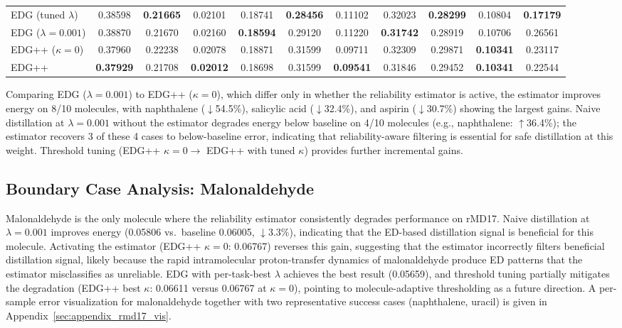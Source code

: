 \begin{table}[!htb]
\begin{tabular}{lcccccccccc}
    EDG (tuned $\lambda$) & 0.38598 & \textbf{0.21665} & 0.02101 & 0.18741 & \textbf{0.28456} & 0.11102 & 0.32023 & \textbf{0.28299} & 0.10804 & \textbf{0.17179} \\
    EDG ($\lambda\!=\!0.001$) & 0.38870 & 0.21670 & 0.02160 & \textbf{0.18594} & 0.29120 & 0.11220 & \textbf{0.31742} & 0.28919 & 0.10706 & 0.26561 \\
    EDG++ ($\kappa\!=\!0$) & 0.37960 & 0.22238 & 0.02078 & 0.18871 & 0.31599 & 0.09711 & 0.32309 & 0.29871 & \textbf{0.10341} & 0.23117 \\
    EDG++ & \textbf{0.37929} & 0.21708 & \textbf{0.02012} & 0.18698 & 0.31599 & \textbf{0.09541} & 0.31846 & 0.29452 & \textbf{0.10341} & 0.22544 \\
    \bottomrule
    \end{tabular}
\end{table}

Comparing EDG ($\lambda\!=\!0.001$) to EDG++ ($\kappa\!=\!0$), which differ only in whether the reliability estimator is active, the estimator improves energy on 8/10 molecules, with naphthalene ($\downarrow$54.5\%), salicylic acid ($\downarrow$32.4\%), and aspirin ($\downarrow$30.7\%) showing the largest gains. Naive distillation at $\lambda\!=\!0.001$ without the estimator degrades energy below baseline on 4/10 molecules (e.g., naphthalene: $\uparrow$36.4\%); the estimator recovers 3 of these 4 cases to below-baseline error, indicating that reliability-aware filtering is essential for safe distillation at this weight. Threshold tuning (EDG++ $\kappa\!=\!0 \to$ EDG++ with tuned $\kappa$) provides further incremental gains.


\subsection{Boundary Case Analysis: Malonaldehyde}
\label{app:boundary}

Malonaldehyde is the only molecule where the reliability estimator consistently degrades performance on rMD17. Naive distillation at $\lambda\!=\!0.001$ improves energy (0.05806 vs.\ baseline 0.06005, $\downarrow$3.3\%), indicating that the ED-based distillation signal is beneficial for this molecule. Activating the estimator (EDG++ $\kappa\!=\!0$: 0.06767) reverses this gain, suggesting that the estimator incorrectly filters beneficial distillation signal, likely because the rapid intramolecular proton-transfer dynamics of malonaldehyde produce ED patterns that the estimator misclassifies as unreliable. EDG with per-task-best $\lambda$ achieves the best result (0.05659), and threshold tuning partially mitigates the degradation (EDG++ best $\kappa$: 0.06611 versus 0.06767 at $\kappa\!=\!0$), pointing to molecule-adaptive thresholding as a future direction. A per-sample error visualization for malonaldehyde together with two representative success cases (naphthalene, uracil) is given in Appendix~\ref{sec:appendix_rmd17_vis}.


